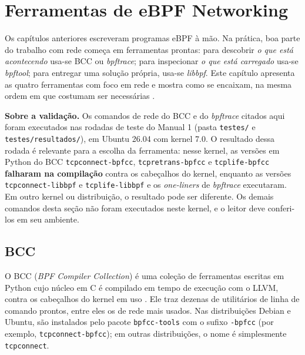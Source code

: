 \chapter{Ferramentas de eBPF Networking}
\label{cap:ferramentas-rede}

Os capítulos anteriores escreveram programas eBPF à mão. Na prática, boa parte do
trabalho com rede começa em ferramentas prontas: para descobrir \textit{o que está
acontecendo} usa-se BCC ou \textit{bpftrace}; para inspecionar \textit{o que está
carregado} usa-se \textit{bpftool}; para entregar uma solução própria, usa-se
\textit{libbpf}. Este capítulo apresenta as quatro ferramentas com foco em rede e
mostra como se encaixam, na mesma ordem em que costumam ser necessárias
\cite{gregg2019, gregg2020}.

\textbf{Sobre a validação.} Os comandos de rede do BCC e do \textit{bpftrace} citados
aqui foram executados nas rodadas de teste do Manual 1 (pasta \texttt{testes/} e
\texttt{testes/resultados/}), em Ubuntu 26.04 com kernel 7.0. O resultado dessa
rodada é relevante para a escolha da ferramenta: nesse kernel, as versões em Python do
BCC \texttt{tcpconnect-bpfcc}, \texttt{tcpretrans-bpfcc} e \texttt{tcplife-bpfcc}
\textbf{falharam na compilação} contra os cabeçalhos do kernel, enquanto as versões
\texttt{tcpconnect-libbpf} e \texttt{tcplife-libbpf} e os \textit{one-liners} de
\textit{bpftrace} executaram. Em outro kernel ou distribuição, o resultado pode ser
diferente. Os demais comandos desta seção não foram executados neste kernel, e o leitor deve
conferi-los em seu ambiente.

\section{BCC}

O BCC (\textit{BPF Compiler Collection}) é uma coleção de ferramentas escritas em Python
cujo núcleo em C é compilado em tempo de execução com o LLVM, contra os cabeçalhos do
kernel em uso \cite{bcc}. Ele traz dezenas de utilitários de linha de comando
prontos, entre eles os de rede mais usados. Nas distribuições Debian e Ubuntu,
são instalados pelo pacote \texttt{bpfcc-tools} com o sufixo \texttt{-bpfcc} (por
exemplo, \texttt{tcpconnect-bpfcc}); em outras distribuições, o nome é simplesmente
\texttt{tcpconnect}.

